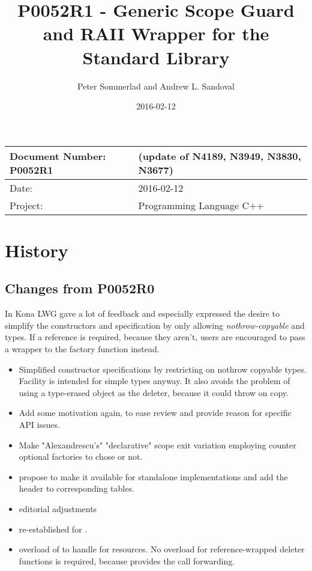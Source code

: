\documentclass[ebook,11pt,article]{memoir}
\title{P0052R1 - Generic Scope Guard and RAII Wrapper for the Standard Library}
\author{Peter Sommerlad and Andrew L. Sandoval}
\date{2016-02-12}                                           %
\begin{document}
\maketitle
\begin{tabular}[t]{|l|l|}\hline 
Document Number: P0052R1 &   (update of N4189, N3949, N3830, N3677)\\\hline
Date: & 2016-02-12 \\\hline
Project: & Programming Language C++\\\hline 
\end{tabular}

\chapter{History}

\section{Changes from P0052R0}
In Kona LWG gave a lot of feedback and especially expressed the desire to simplify the constructors and specification by only allowing \emph{nothrow-copyable}  and  types. If a reference is required, because they aren't, users are encouraged to pass a  wrapper to the factory function instead.
\begin{itemize}
\item Simplified constructor specifications by restricting on nothrow copyable types. Facility is intended for simple types anyway. It also avoids the problem of using a type-erased  object as the deleter, because it could throw on copy.
\item Add some motivation again, to ease review and provide reason for specific API issues.
\item Make "Alexandrescu's" "declarative" scope exit variation employing  counter optional factories to chose or not.
\item propose to make it available for standalone implementations and add the header  to corresponding tables.
\item editorial adjustments
\item re-established  for .
\item overload of  to handle  for resources. No overload for reference-wrapped deleter functions is required, because  provides the call forwarding.
\end{itemize}
\end{document}
